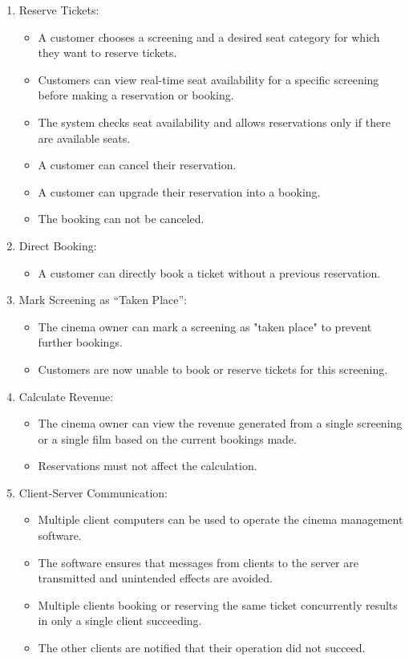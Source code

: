 \begin{enumerate}
    \item Reserve Tickets:
    \begin{itemize}
        \item A customer chooses a screening and a desired seat category for which they want to reserve tickets.
        \item Customers can view real-time seat availability for a specific screening before making a reservation or booking.
        \item The system checks seat availability and allows reservations only if there are available seats.
        \item A customer can cancel their reservation.
        \item A customer can upgrade their reservation into a booking.
        \item The booking can not be canceled.
    \end{itemize}
    
    \item Direct Booking:
    \begin{itemize}
        \item A customer can directly book a ticket without a previous reservation.
    \end{itemize}
    
    \item Mark Screening as \enquote{Taken Place}:
    \begin{itemize}
        \item The cinema owner can mark a screening as "taken place" to prevent further bookings.
        \item Customers are now unable to book or reserve tickets for this screening.
    \end{itemize}
    
    \item Calculate Revenue:
    \begin{itemize}
        \item The cinema owner can view the revenue generated from a single screening or a single film based on the current bookings made.
        \item Reservations must not affect the calculation.
    \end{itemize}
    
    \item Client-Server Communication:
    \begin{itemize}
        \item Multiple client computers can be used to operate the cinema management software.
        \item The software ensures that messages from clients to the server are transmitted and unintended effects are avoided.
        \item Multiple clients booking or reserving the same ticket concurrently results in only a single client succeeding.
        \item The other clients are notified that their operation did not succeed.
    \end{itemize}
    

\end{enumerate}
